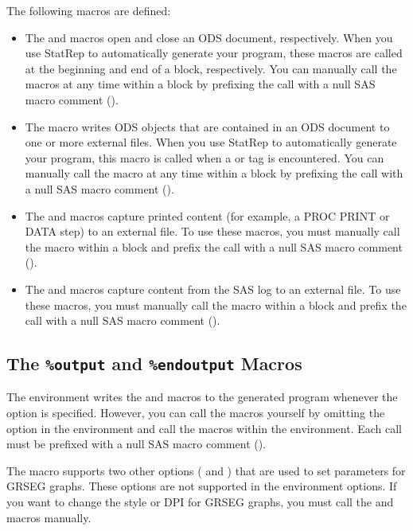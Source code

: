 \documentclass[article,oneside]{memoir}
\newcommand*{\StatRep}{\textsf{StatRep}\xspace}
\begin{document}
  The following macros are defined:
  \begin{itemize}
  \item The  and  macros open and close an ODS document, respectively.
  When you use \StatRep to automatically generate your program, these macros are called at the
  beginning and end of a  block, respectively.
  You can manually call the macros at any time within
  a  block by prefixing the call with a null SAS macro comment (\Code{\%*;}).

  \item The   macro writes ODS objects that are contained in an ODS document to
  one or more external files.
  When you use \StatRep to automatically generate your program, this macro is called when
  a  or  tag is encountered. You can manually call the macro
  at any time within a  block by prefixing the call with a null
  SAS macro comment (\Code{\%*;}).

  \item The  and  macros capture printed content
  (for example, a PROC PRINT or DATA step) to an external file. To use these macros,
  you must manually call the macro
  within a  block and prefix the call with a null
  SAS macro comment (\Code{\%*;}).

  \item The  and  macros capture content from the
  SAS log to an external file. To use these macros,
  you must manually call the macro
  within a  block and prefix the call with a null
  SAS macro comment (\Code{\%*;}).
  \end{itemize}


  \subsection{The \texttt{\%output} and \texttt{\%endoutput} Macros}\label{outputmacro}
  The  environment writes the  and  macros to
  the generated program
  whenever the  option is specified.
  However, you can call the macros
  yourself by omitting the  option in the  environment and
  call the macros within the  environment. Each call must be prefixed
  with a null SAS macro comment (\Code{\%*;}).

  The  macro supports two other options ( and ) that are used to
  set parameters for GRSEG graphs. These options are not supported in the
   environment options. If you want to change the style or DPI for
  GRSEG graphs, you must call the  and  macros manually.
\end{document}
